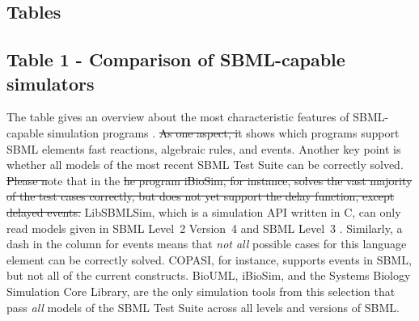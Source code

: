 \documentclass[10pt]{bmc_article}
\newenvironment{bmcformat}{\begin{raggedright}\baselineskip20pt\sloppy\setboolean{publ}{false}}{\end{raggedright}\baselineskip20pt\sloppy}
\begin{document}
\begin{bmcformat}

\section*{Tables}

\subsection*{Table 1 - Comparison of SBML-capable simulators}
The table gives an overview about the most characteristic features of
\acs{SBML}-capable simulation programs .
\sout{As one aspect, i}t shows which programs support \acs{SBML} elements fast reactions, algebraic rules, and events.
Another key point is whether all models of the most recent SBML Test Suite  can be correctly solved.
\sout{Please n}ote that in the  
\sout{he program iBioSim, for instance, solves the vast
majority of the test cases correctly, but does not yet support the delay function,
except delayed events.}
LibSBMLSim, which is a simulation \acs{API} written in C, can only read models given
in \acs{SBML} Level~2 Version~4 and \acs{SBML} Level~3
.
Similarly, a dash in the column for events means that \emph{not all} possible
cases for this language element can be correctly solved.
COPASI, for instance, supports events in \acs{SBML}, but not all of the current 
constructs.
 
BioUML, iBioSim, and the Systems Biology Simulation Core Library, are the 
only simulation tools from this selection that pass \emph{all} models of the
SBML Test Suite across all levels and versions of \acs{SBML}.


\end{bmcformat}
\end{document}
